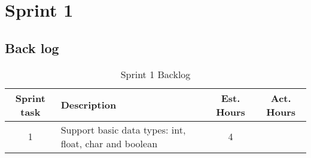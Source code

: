 \chapter{Sprint 1}

\section{Back log}

\begin{table}[ht] \center
\caption{Sprint 1 Backlog}
\begin{tabular}{c p{6cm} c  c}
	Sprint task & Description & Est. Hours & Act. Hours \\
	\hline
	1 & Support basic data types: int, float, char and boolean & 4 & \\
\end{tabular}
\end{table}

